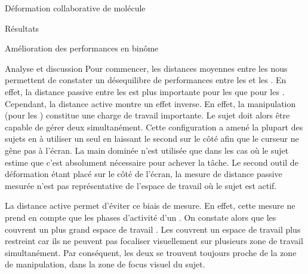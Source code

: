 \documentclass[myfrancais,ngerman,english,french]{mythesis}
\begin{document}
\begin{mychapter}{Déformation collaborative de molécule}
\begin{mysection}{Résultats}
\begin{mysubsection}{Amélioration des performances en binôme}
\begin{mysubsubsection}{Analyse et discussion}
					Pour commencer, les distances moyennes entre les  nous permettent de constater un désequilibre de performances entre les  et les  .
					En effet, la distance passive entre les  est plus importante pour les  que pour les .
					Cependant, la distance active montre un effet inverse.
					En effet, la manipulation  (pour les ) constitue une charge de travail importante.
					Le sujet doit alors être capable de gérer deux  simultanément.
					Cette configuration a amené la plupart des sujets en  à utiliser un seul  en laissant le second sur le côté afin que le curseur ne gêne pas à l'écran.
					La main dominée n'est utilisée que dans les cas où le sujet estime que c'est absolument nécessaire pour achever la tâche.
					Le second outil de déformation étant placé sur le côté de l'écran, la mesure de distance passive mesurée n'est pas représentative de l'espace de travail où le sujet est actif.

					La distance active permet d'éviter ce biais de mesure.
					En effet, cette mesure ne prend en compte que les phases d'activité d'un .
					On constate alors que les  couvrent un plus grand espace de travail .
					Les  couvrent un espace de travail plus restreint car ils ne peuvent pas focaliser visuellement sur plusieurs zone de travail simultanément.
					Par conséquent, les deux  se trouvent toujours proche de la zone de manipulation, dans la zone de focus visuel du sujet.


\end{mysubsubsection}
\end{mysubsection}
\end{mysection}
\end{mychapter}
\end{document}
